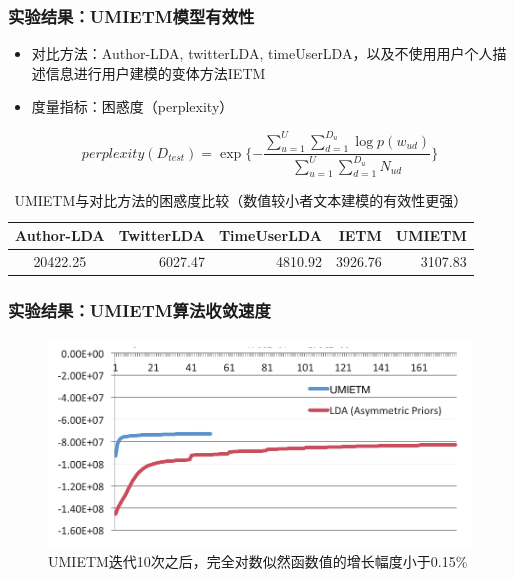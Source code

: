 \begin{frame}
\frametitle{实验结果：UMIETM模型有效性}	
\begin{itemize}
	\item 对比方法：Author-LDA, twitterLDA, timeUserLDA，以及不使用用户个人描述信息进行用户建模的变体方法IETM
	\item 度量指标：困惑度（perplexity）
\end{itemize}
\begin{equation}
\label{eq:UMIETM_perplexity}
perplexity(D_{test})=\exp{\{-\frac{\sum_{u=1}^{U}\sum_{d=1}^{D_u}\log{p(w_{ud})}}{\sum_{u=1}^{U}\sum_{d=1}^{D_u}N_{ud}}\}}
\end{equation}


\begin{table}
\centering
\caption{UMIETM与对比方法的困惑度比较（数值较小者文本建模的有效性更强）}
\begin{tabular}{|c|r|r|r|r|} \hline
Author-LDA & TwitterLDA & TimeUserLDA & IETM & UMIETM\\ \hline
20422.25 & 6027.47 &  4810.92 & 3926.76 & 3107.83\\ \hline
\end{tabular}
\label{tab:heldoutPerplexity}
\end{table}
\end{frame}

\begin{frame}
\frametitle{实验结果：UMIETM算法收敛速度}
\begin{figure}
	\caption{UMIETM迭代10次之后，完全对数似然函数值的增长幅度小于0.15\%}
    \includegraphics[width=1.0\textwidth]{img/UMIETM/completeLoglikelihood.pdf}
\end{figure}

\end{frame}


